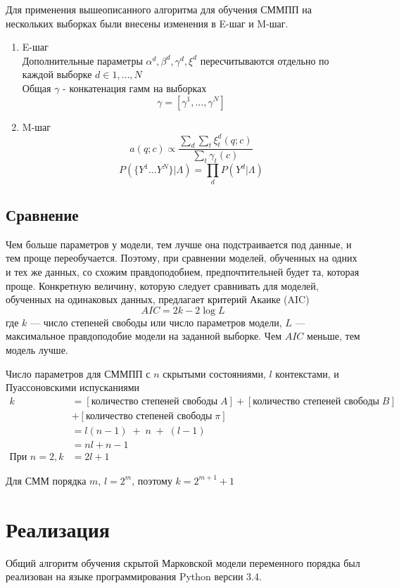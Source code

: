 \documentclass{matmex-diploma-custom}
\begin{document}
Для применения вышеописанного алгоритма для обучения СММПП на нескольких выборках были внесены изменения в E-шаг и M-шаг.
\\
\begin{enumerate}
\item E-шаг\\
Дополнительные параметры $\alpha^{d}, \beta^{d}, \gamma^{d}, \xi^{d}$ пересчитываются отдельно по каждой выборке $d \in {1, \ldots, N}$
\\
Общая $\gamma$ - конкатенация гамм на выборках
$$ \gamma = [\gamma^{1}, \ldots ,\gamma^{N}] $$
\item M-шаг\\
$$ a(q; c) \propto \frac{\sum_{d}{\sum_{t}{\xi^{d}_{t}(q;c)}}}{\sum_{t}{\gamma_{t}(c)}} $$
$$P(\{Y^{1} \ldots Y^{N}\}|\Lambda) = \prod_{d}{P(Y^{d}|\Lambda)}$$
\end{enumerate}

\subsection{Сравнение}
Чем больше параметров у модели, тем лучше она подстраивается под данные, и тем проще переобучается. 
Поэтому, при сравнении моделей, обученных на одних и тех же данных, со схожим правдоподобием, предпочтительней будет та, которая проще. 
Конкретную величину, которую следует сравнивать для моделей, обученных на одинаковых данных, предлагает критерий Акаике (AIC)
$$ AIC = 2k-2\log{L} $$ 
где $ k $ --- число степеней свободы или число параметров модели, $ L $ --- максимальное правдоподобие модели на заданной выборке. Чем $AIC$ меньше, тем модель лучше. 

Число параметров для СММПП с $ n $ скрытыми состояниями, $ l $ контекстами, и Пуассоновскими испусканиями 
\begin{align*}
k &= [\text{количество степеней свободы} \; A ] 
+ [\text{количество степеней свободы} \; B ]
\\&+ [\text{количество степеней свободы} \; \pi ]
\\ &= l(n-1)\;+\;n\;+\;(l-1) \\&= nl + n - 1
\\
\text{При } n=2, k &= 2l + 1
\end{align*}

Для СММ порядка $m$, $l=2^m$, поэтому $k = 2^{m+1}+1$

\section{Реализация}
Общий алгоритм обучения скрытой Марковской модели переменного порядка был реализован на языке программирования Python версии 3.4.
 
\end{document}
